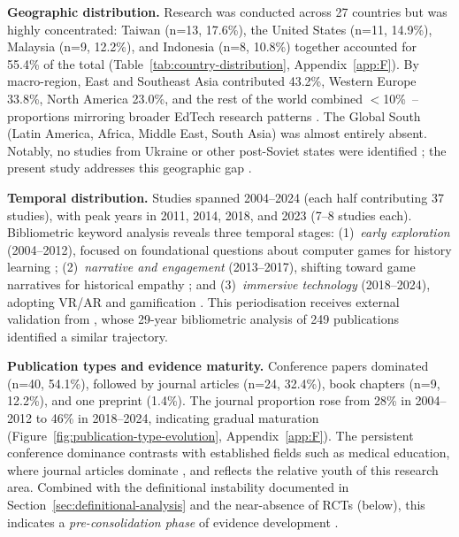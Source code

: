 \textbf{Geographic distribution.}
Research was conducted across 27 countries but was highly concentrated: Taiwan (n=13, 17.6\%), the United States (n=11, 14.9\%), Malaysia (n=9, 12.2\%), and Indonesia (n=8, 10.8\%) together accounted for 55.4\% of the total (Table~\ref{tab:country-distribution}, Appendix~\ref{app:F}). By macro-region, East and Southeast Asia contributed 43.2\%, Western Europe 33.8\%, North America 23.0\%, and the rest of the world combined $<$10\%~-- proportions mirroring broader EdTech research patterns \cite{Bond2020}. The Global South (Latin America, Africa, Middle East, South Asia) was almost entirely absent. Notably, no studies from Ukraine or other post-Soviet states were identified \cite{UNESCO2023}; the present study addresses this geographic gap \cite{KorniienkoSemerikov2024}.

\textbf{Temporal distribution.} \label{par:temporal-distribution}
Studies spanned 2004--2024 (each half contributing 37 studies), with peak years in 2011, 2014, 2018, and 2023 (7--8 studies each). Bibliometric keyword analysis reveals three temporal stages: (1)~\textit{early exploration} (2004--2012), focused on foundational questions about computer games for history learning \cite{55Squire2004, 54Gibson2007, 49Huizenga2007127, 30Zin2008}; (2)~\textit{narrative and engagement} (2013--2017), shifting toward game narratives for historical empathy \cite{12Gilbert2019108, 59Kee2014270, 4Cruz2017}; and (3)~\textit{immersive technology} (2018--2024), adopting VR/AR and gamification \cite{10Huaman2019220, 6Czerwinski2018, 32Cheng20241718, Alexov2023}. This periodisation receives external validation from \cite{Shen2025}, whose 29-year bibliometric analysis of 249 publications identified a similar trajectory.

\textbf{Publication types and evidence maturity.}
Conference papers dominated (n=40, 54.1\%), followed by journal articles (n=24, 32.4\%), book chapters (n=9, 12.2\%), and one preprint (1.4\%). The journal proportion rose from 28\% in 2004--2012 to 46\% in 2018--2024, indicating gradual maturation (Figure~\ref{fig:publication-type-evolution}, Appendix~\ref{app:F}). The persistent conference dominance contrasts with established fields such as medical education, where journal articles dominate \cite{vanGaalen2021}, and reflects the relative youth of this research area. Combined with the definitional instability documented in Section~\ref{sec:definitional-analysis} and the near-absence of RCTs (below), this indicates a \textit{pre-consolidation phase} of evidence development \cite{KorniienkoSemerikov2024}.

